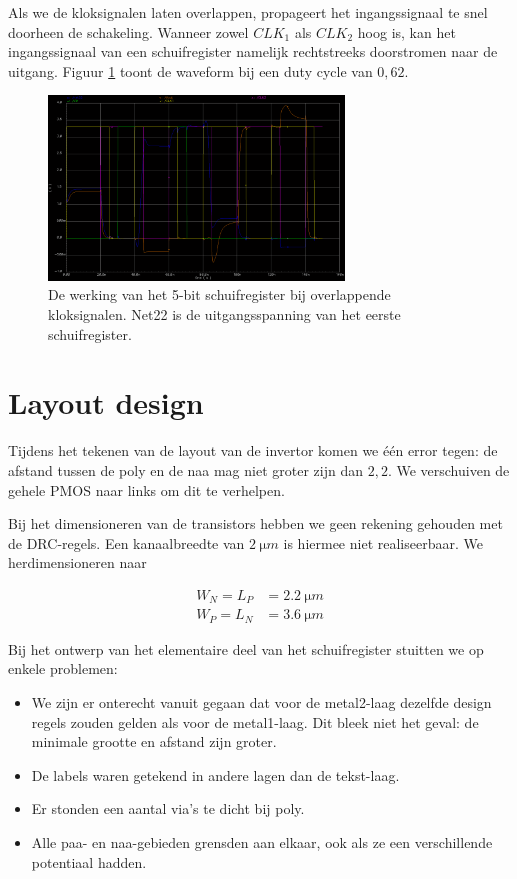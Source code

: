 \documentclass[11pt,a4paper,oneside,dutch]{article}
\begin{document}
Als we de kloksignalen laten overlappen, propageert het ingangssignaal te snel doorheen de schakeling. Wanneer zowel $CLK_1$ als $CLK_2$ hoog is, kan het ingangssignaal van een schuifregister namelijk rechtstreeks doorstromen naar de uitgang. Figuur \ref{fig:wave_overlap} toont de waveform bij een duty cycle van $0,62$.

\begin{figure}[htp]
	\centering
	\includegraphics[width=0.7\textwidth]{wave_overlap.png}
	\caption{De werking van het 5-bit schuifregister bij overlappende kloksignalen. Net22 is de uitgangsspanning van het eerste schuifregister.}
	\label{fig:wave_overlap}
\end{figure}



\section{Layout design}

Tijdens het tekenen van de layout van de invertor komen we één error tegen: de afstand tussen de poly en de naa mag niet groter zijn dan $2,2$. We verschuiven de gehele PMOS naar links om dit te verhelpen.

Bij het dimensioneren van de transistors hebben we geen rekening gehouden met de DRC-regels. Een kanaalbreedte van $\SI{2}{\micro m}$ is hiermee niet realiseerbaar. We herdimensioneren naar

\begin{align*}
W_N = L_P &= \SI{2,2}{\micro m} \\
W_P = L_N &= \SI{3,6}{\micro m}
\end{align*}

Bij het ontwerp van het elementaire deel van het schuifregister stuitten we op enkele problemen:

\begin{itemize}
\item We zijn er onterecht vanuit gegaan dat voor de metal2-laag dezelfde design regels zouden gelden als voor de metal1-laag. Dit bleek niet het geval: de minimale grootte en afstand zijn groter.
\item De labels waren getekend in andere lagen dan de tekst-laag.
\item Er stonden een aantal via's te dicht bij poly.
\item Alle paa- en naa-gebieden grensden aan elkaar, ook als ze een verschillende potentiaal hadden.
\end{itemize}
\end{document}
